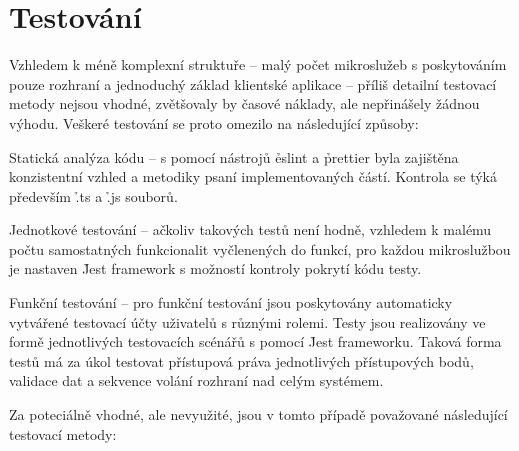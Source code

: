 \chapter{Testování}\label{ch:testing}


Vzhledem k méně komplexní struktuře  – malý počet mikroslužeb s poskytováním pouze  rozhraní a jednoduchý základ klientské aplikace – příliš detailní testovací metody nejsou vhodné, zvětšovaly by časové náklady, ale nepřinášely žádnou výhodu.
Veškeré testování se proto omezilo na následující způsoby:

\begin{dl}
   \item[Statická analýza kódu] – s pomocí nástrojů \h{eslint} a \h{prettier} byla zajištěna konzistentní vzhled a metodiky psaní implementovaných částí.
   Kontrola se týká především \h{.ts} a \h{.js} souborů.
   \item[Jednotkové testování] – ačkoliv takových testů není hodně, vzhledem k malému počtu samostatných funkcionalit vyčlenených do funkcí, pro každou mikroslužbou je nastaven \h{Jest} framework s možností kontroly pokrytí kódu testy.
   \item[Funkční testování] – pro funkční testování jsou poskytovány automaticky vytvářené testovací účty uživatelů s různými rolemi.
   Testy jsou realizovány ve formě jednotlivých testovacích scénářů s pomocí \h{Jest} frameworku.
   Taková forma testů má za úkol testovat přístupová práva jednotlivých přístupových bodů, validace dat a sekvence volání  rozhraní nad celým systémem.
\end{dl}

\newpage

Za poteciálně vhodné, ale nevyužité, jsou v tomto případě považované následující testovací metody:


